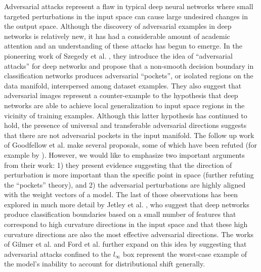 Adversarial attacks represent a flaw in typical deep neural networks where small targeted perturbations in the input space can cause large undesired changes in the output space.
Although the discovery of adversarial examples in deep networks is relatively new, it has had a considerable amount of academic attention and an understanding of these attacks has begun to emerge.
In the pioneering work of Szegedy et al. \citeyearpar{szegedy2013intriguing}, they introduce the idea of ``adversarial attacks'' for deep networks and propose that a non-smooth decision boundary in classification networks produces adversarial ``pockets'', or isolated regions on the data manifold, interspersed among dataset examples.
They also suggest that adversarial images represent a counter-example to the hypothesis that deep networks are able to achieve local generalization to input space regions in the vicinity of training examples.
Although this latter hypothesis has continued to hold, the presence of universal and transferable adversarial directions \parencite{moosavi2017universal} suggests that there are not adversarial pockets in the input manifold.
The follow up work of Goodfellow et al. \citeyearpar{goodfellow2014explaining} make several proposals, some of which have been refuted (for example by \cite{jetley2018friends}).
However, we would like to emphasize two important arguments from their work: 1) they present evidence suggesting that the direction of perturbation is more important than the specific point in space (further refuting the ``pockets'' theory), and 2) the adversarial perturbations are highly aligned with the weight vectors of a model.
The last of those observations has been explored in much more detail by Jetley et al. \citeyearpar{jetley2018friends}, who suggest that deep networks produce classification boundaries based on a small number of features that correspond to high curvature directions in the input space and that these high curvature directions are also the most effective adversarial directions.
The works of Gilmer et al. \citeyearpar{gilmer2018adversarial} and Ford et al. \citeyearpar{ford2019adversarial} further expand on this idea by suggesting that adversarial attacks confined to the $l_{\infty}$ box represent the worst-case example of the model's inability to account for distributional shift generally.

